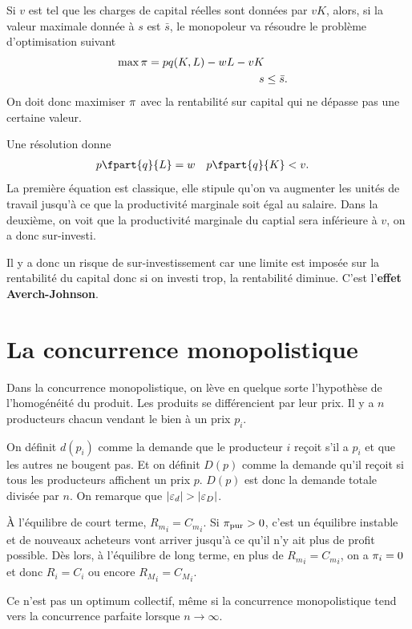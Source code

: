 \begin{itemize}
    Si $v$ est tel que les charges de capital réelles sont données par
    $vK$, alors, si la valeur maximale donnée à $s$ est $\bar{s}$,
    le monopoleur va résoudre le problème d'optimisation suivant
    \begin{align*}
      \max \pi = pq(K,L) - wL - vK\\
      s & \leq \bar{s}.
    \end{align*}
    On doit donc maximiser $\pi$ avec la rentabilité sur capital
    qui ne dépasse pas une certaine valeur.

    Une résolution donne
    \begin{align*}
      p \fpart{q}{L} & = w & p \fpart{q}{K} & < v.
    \end{align*}
    La première équation est classique, elle stipule qu'on va
    augmenter les unités de travail jusqu'à ce que la productivité
    marginale soit égal au salaire.
    Dans la deuxième, on voit que la productivité marginale du captial
    sera inférieure à $v$, on a donc sur-investi.

    Il y a donc un risque de sur-investissement car
    une limite est imposée sur la rentabilité du capital donc si on investi
    trop, la rentabilité diminue.
    C'est l'\textbf{effet Averch-Johnson}.
\end{itemize}

\section{La concurrence monopolistique}
Dans la concurrence monopolistique, on lève en quelque sorte l'hypothèse de
l'homogénéité du produit.
Les produits se différencient par leur prix.
Il y a $n$ producteurs chacun vendant le bien à un prix $p_i$.

On définit $d(p_i)$ comme la demande que le producteur $i$ reçoit s'il a
$p_i$ et que les autres ne bougent pas.
Et on définit $D(p)$ comme la demande qu'il reçoit si tous
les producteurs affichent un prix $p$.
$D(p)$ est donc la demande totale divisée par $n$.
On remarque que $|\varepsilon_d| > |\varepsilon_D|$.

À l'équilibre de court terme, ${R_m}_i = {C_m}_i$.
Si $\pi_{\mathrm{pur}} > 0$, c'est un équilibre instable et de nouveaux
acheteurs vont arriver jusqu'à ce qu'il n'y ait plus de profit possible.
Dès lors, à l'équilibre de long terme,
en plus de ${R_m}_i = {C_m}_i$, on a $\pi_i = 0$ et donc $R_i = C_i$
ou encore ${R_M}_i = {C_M}_i$.

Ce n'est pas un optimum collectif, même si la concurrence monopolistique
tend vers la concurrence parfaite lorsque $n \to \infty$.

